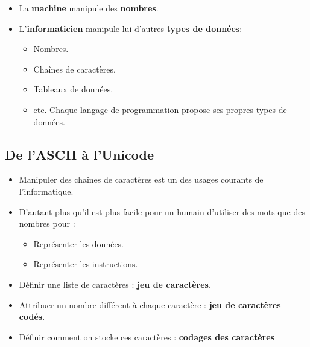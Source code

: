 \begin{slide}
	\begin{itemize}
		\item La \textbf{machine} manipule des \textbf{nombres}.
		\item L'\textbf{informaticien} manipule lui d'autres \textbf{types de données}:
		\begin{itemize}
			\item Nombres.
			\item Chaînes de caractères.
			\item Tableaux de données.
			\item etc. Chaque langage de programmation propose ses propres types de données.
		\end{itemize}
	\end{itemize}
\end{slide}

\subsection{De l'ASCII à l'Unicode}
\begin{slide}
	\begin{itemize}
		\item Manipuler des chaînes de caractères est un des usages courants de l'informatique.
		\item D'autant plus qu'il est plus facile pour un humain d'utiliser des mots que des nombres pour :
			\begin{itemize}
				\item Représenter les données.
				\item Représenter les instructions.
			\end{itemize}
	\end{itemize}
\end{slide}
\begin{slide}
	\begin{itemize}
		\item Définir une liste de caractères : \textbf{jeu de caractères}.
		\item Attribuer un nombre différent à chaque caractère : \textbf{jeu de caractères codés}.
		\item Définir comment on stocke ces caractères : \textbf{codages des caractères}
	\end{itemize}
\end{slide}

